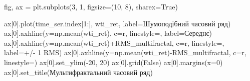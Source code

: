 \documentclass[
  letterpaper,
]{report}
\newenvironment{Shaded}{\begin{snugshade}}{\end{snugshade}}
\newcommand{\DecValTok}[1]{\textcolor[rgb]{0.68,0.00,0.00}{#1}}
\newcommand{\NormalTok}[1]{\textcolor[rgb]{0.00,0.23,0.31}{#1}}
\newcommand{\OperatorTok}[1]{\textcolor[rgb]{0.37,0.37,0.37}{#1}}
\newcommand{\StringTok}[1]{\textcolor[rgb]{0.13,0.47,0.30}{#1}}
\newcommand{\VariableTok}[1]{\textcolor[rgb]{0.07,0.07,0.07}{#1}}
\begin{document}
\begin{Shaded}
\begin{Highlighting}[]
\NormalTok{fig, ax }\OperatorTok{=}\NormalTok{ plt.subplots(}\DecValTok{3}\NormalTok{, }\DecValTok{1}\NormalTok{, figsize}\OperatorTok{=}\NormalTok{(}\DecValTok{10}\NormalTok{, }\DecValTok{8}\NormalTok{), sharex}\OperatorTok{=}\VariableTok{True}\NormalTok{)}

\NormalTok{ax[}\DecValTok{0}\NormalTok{].plot(time\_ser.index[}\DecValTok{1}\NormalTok{:], wti\_ret, label}\OperatorTok{=}\StringTok{\textquotesingle{}Шумоподібний часовий ряд\textquotesingle{}}\NormalTok{)}
\NormalTok{ax[}\DecValTok{0}\NormalTok{].axhline(y}\OperatorTok{=}\NormalTok{np.mean(wti\_ret), c}\OperatorTok{=}\StringTok{\textquotesingle{}r\textquotesingle{}}\NormalTok{, linestyle}\OperatorTok{=}\StringTok{\textquotesingle{}{-}{-}\textquotesingle{}}\NormalTok{, label}\OperatorTok{=}\StringTok{\textquotesingle{}Середнє\textquotesingle{}}\NormalTok{)}
\NormalTok{ax[}\DecValTok{0}\NormalTok{].axhline(y}\OperatorTok{=}\NormalTok{np.mean(wti\_ret)}\OperatorTok{+}\NormalTok{RMS\_multifractal, c}\OperatorTok{=}\StringTok{\textquotesingle{}r\textquotesingle{}}\NormalTok{, linestyle}\OperatorTok{=}\StringTok{\textquotesingle{}{-}\textquotesingle{}}\NormalTok{, label}\OperatorTok{=}\StringTok{\textquotesingle{}+/{-} 1 RMS\textquotesingle{}}\NormalTok{)}
\NormalTok{ax[}\DecValTok{0}\NormalTok{].axhline(y}\OperatorTok{=}\NormalTok{np.mean(wti\_ret)}\OperatorTok{{-}}\NormalTok{RMS\_multifractal, c}\OperatorTok{=}\StringTok{\textquotesingle{}r\textquotesingle{}}\NormalTok{, linestyle}\OperatorTok{=}\StringTok{\textquotesingle{}{-}\textquotesingle{}}\NormalTok{)}
\NormalTok{ax[}\DecValTok{0}\NormalTok{].set\_ylim(}\OperatorTok{{-}}\DecValTok{20}\NormalTok{, }\DecValTok{20}\NormalTok{)}
\NormalTok{ax[}\DecValTok{0}\NormalTok{].grid(}\VariableTok{False}\NormalTok{)}
\NormalTok{ax[}\DecValTok{0}\NormalTok{].margins(x}\OperatorTok{=}\DecValTok{0}\NormalTok{)}
\NormalTok{ax[}\DecValTok{0}\NormalTok{].set\_title(}\StringTok{\textquotesingle{}Мультифрактальний часовий ряд\textquotesingle{}}\NormalTok{)}


\end{Highlighting}
\end{Shaded}
\end{document}

